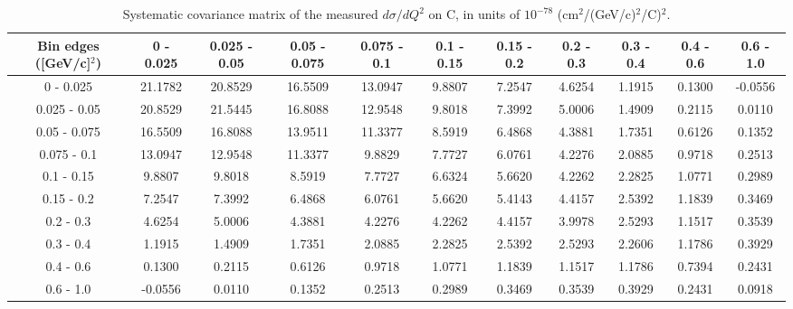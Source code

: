 \documentclass[aps,prl,twocolumn,superscriptaddress,nofootinbib]{revtex4-1}
\begin{document}
\begin{table}[h!]
  \centering
  \caption{Systematic covariance matrix of the measured $d\sigma/dQ^{2}$ on C, in units of $10^{-78}$ (cm$^{2}$/(GeV/c)$^{2}$/C)$^{2}$.}
    \begin{tabular}{c||cccccccccc}
      Bin edges ([GeV/c]$^{2}$) & 0 - 0.025 & 0.025 - 0.05 & 0.05 - 0.075 & 0.075 - 0.1 & 0.1 - 0.15 & 0.15 - 0.2 & 0.2 - 0.3 & 0.3 - 0.4 & 0.4 - 0.6 & 0.6 - 1.0 \\
\hline \hline
         0 - 0.025 & 21.1782 & 20.8529 & 16.5509 & 13.0947 &  9.8807 &  7.2547 &  4.6254 &  1.1915 &  0.1300 & -0.0556 \\
      0.025 - 0.05 & 20.8529 & 21.5445 & 16.8088 & 12.9548 &  9.8018 &  7.3992 &  5.0006 &  1.4909 &  0.2115 &  0.0110 \\
      0.05 - 0.075 & 16.5509 & 16.8088 & 13.9511 & 11.3377 &  8.5919 &  6.4868 &  4.3881 &  1.7351 &  0.6126 &  0.1352 \\
       0.075 - 0.1 & 13.0947 & 12.9548 & 11.3377 &  9.8829 &  7.7727 &  6.0761 &  4.2276 &  2.0885 &  0.9718 &  0.2513 \\
        0.1 - 0.15 &  9.8807 &  9.8018 &  8.5919 &  7.7727 &  6.6324 &  5.6620 &  4.2262 &  2.2825 &  1.0771 &  0.2989 \\
        0.15 - 0.2 &  7.2547 &  7.3992 &  6.4868 &  6.0761 &  5.6620 &  5.4143 &  4.4157 &  2.5392 &  1.1839 &  0.3469 \\
         0.2 - 0.3 &  4.6254 &  5.0006 &  4.3881 &  4.2276 &  4.2262 &  4.4157 &  3.9978 &  2.5293 &  1.1517 &  0.3539 \\
         0.3 - 0.4 &  1.1915 &  1.4909 &  1.7351 &  2.0885 &  2.2825 &  2.5392 &  2.5293 &  2.2606 &  1.1786 &  0.3929 \\
         0.4 - 0.6 &  0.1300 &  0.2115 &  0.6126 &  0.9718 &  1.0771 &  1.1839 &  1.1517 &  1.1786 &  0.7394 &  0.2431 \\
         0.6 - 1.0 & -0.0556 &  0.0110 &  0.1352 &  0.2513 &  0.2989 &  0.3469 &  0.3539 &  0.3929 &  0.2431 &  0.0918 \\
    \end{tabular}
  \label{tablecov:C_Systematic_Q2}
\end{table}
\end{document}
